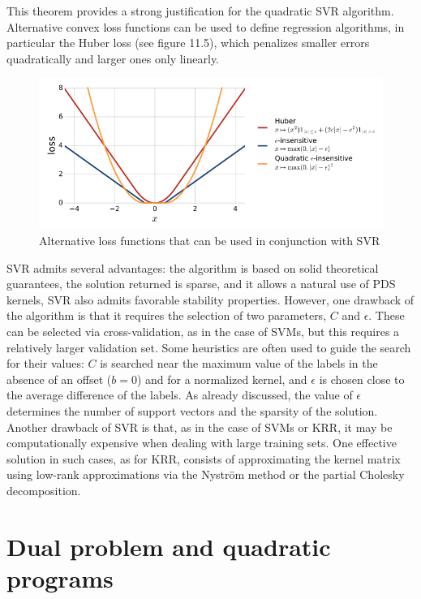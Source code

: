 \documentclass[fleqn,10pt]{olplainarticle}
\begin{document}
This theorem provides a strong justification for the quadratic SVR algorithm. Alternative convex loss functions can be used to define regression algorithms, in particular the Huber loss (see figure 11.5), which penalizes smaller errors quadratically and larger ones only linearly.

\begin{figure}
    \centering
    \includegraphics[width=0.8\linewidth]{Alternative loss functions with SVR.png}
    \caption{Alternative loss functions that can be used in conjunction with SVR}
    \label{fig:your_label}
\end{figure}


SVR admits several advantages: the algorithm is based on solid theoretical guarantees, the solution returned is sparse, and it allows a natural use of PDS kernels, SVR also admits favorable stability properties. However, one drawback of the algorithm is that it requires the selection of two parameters, \(C\) and \(\epsilon\). These can be selected via cross-validation, as in the case of SVMs, but this requires a relatively larger validation set. Some heuristics are often used to guide the search for their values: \(C\) is searched near the maximum value of the labels in the absence of an offset (\(b = 0\)) and for a normalized kernel, and \(\epsilon\) is chosen close to the average difference of the labels. As already discussed, the value of \(\epsilon\) determines the number of support vectors and the sparsity of the solution. Another drawback of SVR is that, as in the case of SVMs or KRR, it may be computationally expensive when dealing with large training sets. One effective solution in such cases, as for KRR, consists of approximating the kernel matrix using low-rank approximations via the Nystr{\"o}m method or the partial Cholesky decomposition. 

\section{Dual problem and quadratic programs}
\end{document}
